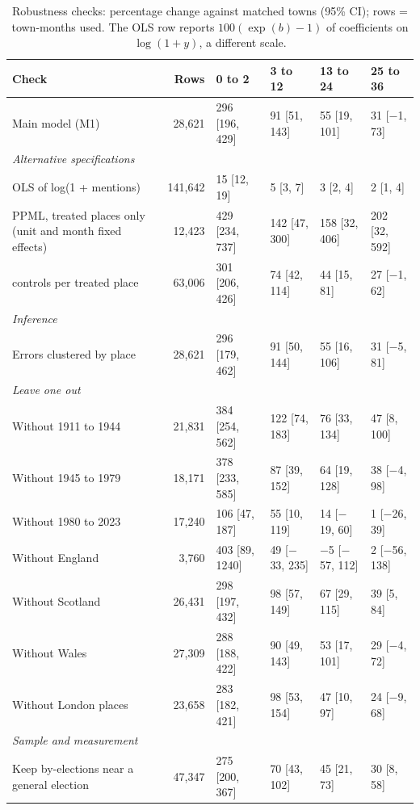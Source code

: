 \documentclass[11pt,a4paper]{article}
\begin{document}
\begin{table}[tbp]\centering\scriptsize\caption{Robustness checks: percentage change against matched towns (95\% CI); rows = town-months used. The OLS row reports $100(\exp(b)-1)$ of coefficients on $\log(1+y)$, a different scale.}\label{tab:robust}\setlength{\tabcolsep}{3pt}\begin{tabular}{p{5.6cm}rllll}\toprule Check & Rows & 0 to 2 & 3 to 12 & 13 to 24 & 25 to 36\\\midrule
Main model (M1) & 28,621 & 296 [196, 429] & 91 [51, 143] & 55 [19, 101] & 31 [$-$1, 73]\\
\multicolumn{6}{l}{\textit{Alternative specifications}}\\
\quad OLS of log(1 + mentions) & 141,642 & 15 [12, 19] & 5 [3, 7] & 3 [2, 4] & 2 [1, 4]\\
\quad PPML, treated places only (unit and month fixed effects) & 12,423 & 429 [234, 737] & 142 [47, 300] & 158 [32, 406] & 202 [32, 592]\\
\quad 10 controls per treated place & 63,006 & 301 [206, 426] & 74 [42, 114] & 44 [15, 81] & 27 [$-$1, 62]\\
\multicolumn{6}{l}{\textit{Inference}}\\
\quad Errors clustered by place & 28,621 & 296 [179, 462] & 91 [50, 144] & 55 [16, 106] & 31 [$-$5, 81]\\
\multicolumn{6}{l}{\textit{Leave one out}}\\
\quad Without 1911 to 1944 & 21,831 & 384 [254, 562] & 122 [74, 183] & 76 [33, 134] & 47 [8, 100]\\
\quad Without 1945 to 1979 & 18,171 & 378 [233, 585] & 87 [39, 152] & 64 [19, 128] & 38 [$-$4, 98]\\
\quad Without 1980 to 2023 & 17,240 & 106 [47, 187] & 55 [10, 119] & 14 [$-$19, 60] & 1 [$-$26, 39]\\
\quad Without England & 3,760 & 403 [89, 1240] & 49 [$-$33, 235] & $-$5 [$-$57, 112] & 2 [$-$56, 138]\\
\quad Without Scotland & 26,431 & 298 [197, 432] & 98 [57, 149] & 67 [29, 115] & 39 [5, 84]\\
\quad Without Wales & 27,309 & 288 [188, 422] & 90 [49, 143] & 53 [17, 101] & 29 [$-$4, 72]\\
\quad Without London places & 23,658 & 283 [182, 421] & 98 [53, 154] & 47 [10, 97] & 24 [$-$9, 68]\\
\multicolumn{6}{l}{\textit{Sample and measurement}}\\
\quad Keep by-elections near a general election & 47,347 & 275 [200, 367] & 70 [43, 102] & 45 [21, 73] & 30 [8, 58]\\

\end{tabular}
\end{table}
\end{document}
